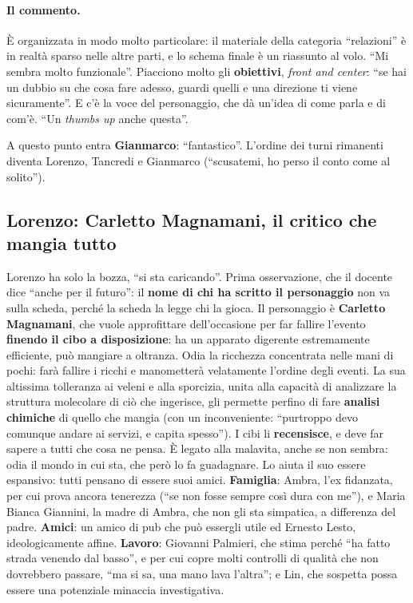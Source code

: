 \paragraph{Il commento.} È organizzata in modo molto particolare: il materiale
della categoria ``relazioni'' è in realtà sparso nelle altre parti, e lo schema
finale è un riassunto al volo. ``Mi sembra molto funzionale''. Piacciono molto gli
\textbf{obiettivi}, \emph{front and center}: ``se hai un dubbio su che cosa fare
adesso, guardi quelli e una direzione ti viene sicuramente''. E c'è la voce del
personaggio, che dà un'idea di come parla e di com'è. ``Un \emph{thumbs up} anche
questa''.

A questo punto entra \textbf{Gianmarco}: ``fantastico''. L'ordine dei turni
rimanenti diventa Lorenzo, Tancredi e Gianmarco (``scusatemi, ho perso il conto
come al solito'').

\subsection{Lorenzo: Carletto Magnamani, il critico che mangia tutto}

Lorenzo ha solo la bozza, ``si sta caricando''. Prima osservazione, che il docente
dice ``anche per il futuro'': il \textbf{nome di chi ha scritto il personaggio} non
va sulla scheda, perché la scheda la legge chi la gioca. Il personaggio è
\textbf{Carletto Magnamani}, che vuole approfittare dell'occasione per far
fallire l'evento \textbf{finendo il cibo a disposizione}: ha un apparato digerente
estremamente efficiente, può mangiare a oltranza. Odia la ricchezza concentrata
nelle mani di pochi: farà fallire i ricchi e manometterà velatamente l'ordine
degli eventi. La sua altissima tolleranza ai veleni e alla sporcizia, unita alla
capacità di analizzare la struttura molecolare di ciò che ingerisce, gli permette
perfino di fare \textbf{analisi chimiche} di quello che mangia (con un
inconveniente: ``purtroppo devo comunque andare ai servizi, e capita spesso'').
I cibi li \textbf{recensisce}, e deve far sapere a tutti che cosa ne pensa. È
legato alla malavita, anche se non sembra: odia il mondo in cui sta, che però lo
fa guadagnare. Lo aiuta il suo essere espansivo: tutti pensano di essere suoi
amici. \textbf{Famiglia}: Ambra, l'ex fidanzata, per cui prova ancora tenerezza
(``se non fosse sempre così dura con me''), e Maria Bianca Giannini, la madre di
Ambra, che non gli sta simpatica, a differenza del padre. \textbf{Amici}: un amico
di pub che può essergli utile ed Ernesto Lesto, ideologicamente affine.
\textbf{Lavoro}: Giovanni Palmieri, che stima perché ``ha fatto strada venendo dal
basso'', e per cui copre molti controlli di qualità che non dovrebbero passare,
``ma si sa, una mano lava l'altra''; e Lin, che sospetta possa essere una
potenziale minaccia investigativa.

